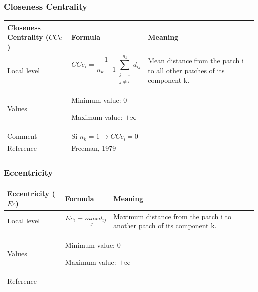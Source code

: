 \documentclass{article}
\begin{document}
\subsubsection{Closeness Centrality}
\label{metric_CCe}
\begin{table}[H]
\begin{tabular}{|m{3.24cm}|m{4.4810004cm}m{7.924cm}|}
\hline
Closeness Centrality ($CCe$) &
\multicolumn{1}{m{4.4810004cm}|}{Formula} &
Meaning\\\hline
Local level

 &
\multicolumn{1}{m{4.4810004cm}|}{\begin{equation*}
{\mathit{CCe}}_{i}=\frac{1}{{n}_{k}-1}\sum
_{\begin{matrix}j=1\\j{\neq}i\end{matrix}}^{{n}_{k}}{{d}_{\mathit{ij}}}
\end{equation*}
} &
Mean distance from the patch i to all other patches of its component k.
\\\hline
Values &
\multicolumn{2}{m{12.6050005cm}|}{Minimum value: 0

Maximum value:  $+{\infty}$

}\\\hline
Comment &
\multicolumn{2}{m{12.6050005cm}|}{Si  ${n}_{k}=1\rightarrow
{\mathit{CCe}}_{i}=0$ }\\\hline
Reference &
\multicolumn{2}{m{12.6050005cm}|}{Freeman, 1979}\\\hline
\end{tabular}
\end{table}


\subsubsection{Eccentricity}
\label{metric_Ec}
\begin{table}[H]
\begin{tabular}{|m{3.24cm}|m{4.4810004cm}m{7.924cm}|}
\hline
Eccentricity ($Ec$) &
\multicolumn{1}{m{4.4810004cm}|}{Formula} &
Meaning\\\hline
Local level

 &
\multicolumn{1}{m{4.4810004cm}|}{\begin{equation*}
{\mathit{Ec}}_{i}=\underset{j}{\mathit{max}}{d}_{\mathit{ij}}
\end{equation*}
} &
Maximum distance from the patch i to another patch of its component k.
\\\hline
Values &
\multicolumn{2}{m{12.6050005cm}|}{Minimum value: 0

Maximum value:  $+{\infty}$

}\\\hline
Reference &
\multicolumn{2}{m{12.6050005cm}|}{\cite{Urban2001}
}\\\hline
\end{tabular}
\end{table}
\end{document}
